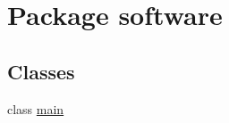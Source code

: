 \hypertarget{namespacesoftware}{}\section{Package software}
\label{namespacesoftware}
\subsection*{Classes}
\begin{DoxyCompactItemize}
\item 
class \hyperlink{classsoftware_1_1main}{main}
\end{DoxyCompactItemize}
